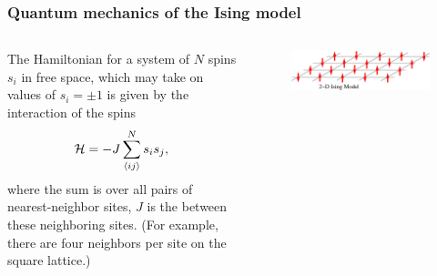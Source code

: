 \documentclass[hyperref={colorlinks=true}]{beamer}
\begin{document}

\begin{frame}%
  \frametitle{Quantum mechanics of the Ising model}

  \begin{columns}
  
  
  The Hamiltonian for a system of $N$ spins $s_i$ in free space, which may take on values of $s_i = \pm1$ is given by the interaction of the spins
  \begin{equation}
    \mathcal{H} = -J \sum_{\langle ij \rangle}^N s_i s_{j} , \label{eq:ising-free}
  \end{equation} 
  where the sum  is over all pairs of nearest-neighbor sites, $J$ is the  between these neighboring sites. (For example, there are four neighbors per site on the square lattice.)
  
  \vspace{-0.5cm}
  
    \begin{figure}
      \centering
      \includegraphics[width=0.8\columnwidth]{Ising-spins-2D.png}
    \end{figure}
    
  

\end{columns}
\end{frame}
\end{document}
